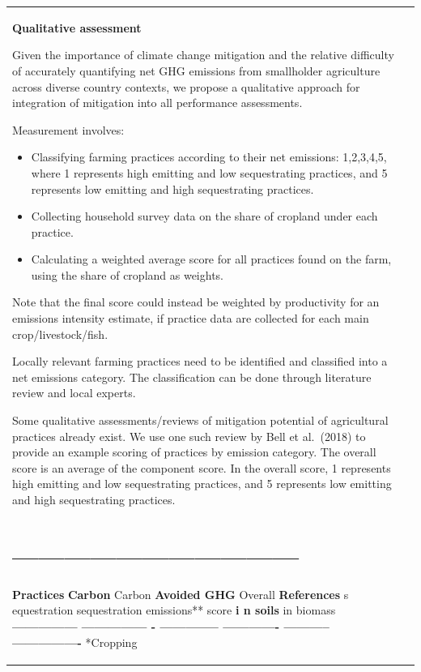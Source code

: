 \documentclass[
  letterpaper,
  DIV=11,
  numbers=noendperiod]{scrreprt}
\begin{document}
\begin{longtable}[]{@{}
  >{\raggedright\arraybackslash}p{}
  >{\raggedright\arraybackslash}p{}@{}}
\begin{minipage}[t]{\linewidth}
\textbf{Qualitative assessment}

Given the importance of climate change mitigation and the relative
difficulty of accurately quantifying net GHG emissions from smallholder
agriculture across diverse country contexts, we propose a qualitative
approach for integration of mitigation into all performance assessments.

Measurement involves:

\begin{itemize}
\item
  Classifying farming practices according to their net emissions:
  1,2,3,4,5, where 1 represents high emitting and low sequestrating
  practices, and 5 represents low emitting and high sequestrating
  practices.
\item
  Collecting household survey data on the share of cropland under each
  practice.
\item
  Calculating a weighted average score for all practices found on the
  farm, using the share of cropland as weights.
\end{itemize}

Note that the final score could instead be weighted by productivity for
an emissions intensity estimate, if practice data are collected for each
main crop/livestock/fish.

Locally relevant farming practices need to be identified and classified
into a net emissions category. The classification can be done through
literature review and local experts.

Some qualitative assessments/reviews of mitigation potential of
agricultural practices already exist. We use one such review by Bell et
al.~(2018) to provide an example scoring of practices by emission
category. The overall score is an average of the component score. In the
overall score, 1 represents high emitting and low sequestrating
practices, and 5 represents low emitting and high sequestrating
practices.

\section{---------------------------------}\label{section}

\textbf{Practices} \textbf{Carbon }Carbon \textbf{Avoided GHG }Overall
\textbf{References} s equestration sequestration emissions**
score\textbf{ i n soils} in biomass\textbf{ ---------------
--------------- - -------------- ------------- -----------
---------------- }*Cropping


\end{minipage}
\end{longtable}
\end{document}
